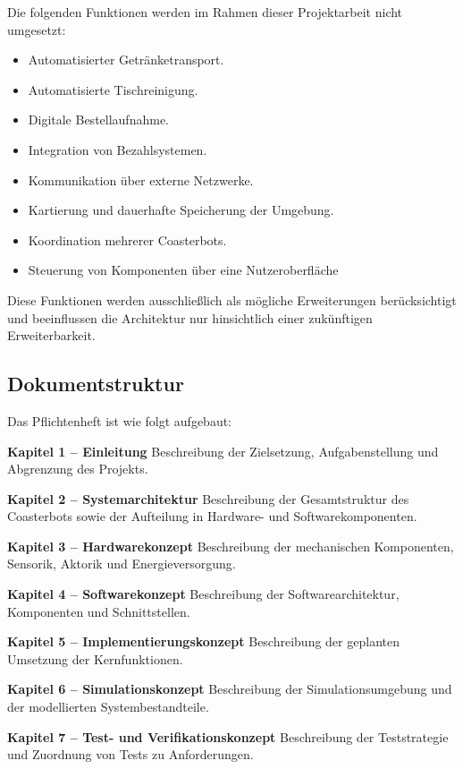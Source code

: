 Die folgenden Funktionen werden im Rahmen dieser Projektarbeit nicht
umgesetzt:

\begin{itemize}
\tightlist
\item
  Automatisierter Getränketransport.
\item
  Automatisierte Tischreinigung.
\item
  Digitale Bestellaufnahme.
\item
  Integration von Bezahlsystemen.
\item
  Kommunikation über externe Netzwerke.
\item
  Kartierung und dauerhafte Speicherung der Umgebung.
\item
  Koordination mehrerer Coasterbots.
\item
  Steuerung von Komponenten über eine Nutzeroberfläche
\end{itemize}

Diese Funktionen werden ausschließlich als mögliche Erweiterungen
berücksichtigt und beeinflussen die Architektur nur hinsichtlich einer
zukünftigen Erweiterbarkeit.

\subsection{Dokumentstruktur}\label{dokumentstruktur}

Das Pflichtenheft ist wie folgt aufgebaut:

\textbf{Kapitel 1 -- Einleitung} Beschreibung der Zielsetzung,
Aufgabenstellung und Abgrenzung des Projekts.

\textbf{Kapitel 2 -- Systemarchitektur} Beschreibung der Gesamtstruktur
des Coasterbots sowie der Aufteilung in Hardware- und
Softwarekomponenten.

\textbf{Kapitel 3 -- Hardwarekonzept} Beschreibung der mechanischen
Komponenten, Sensorik, Aktorik und Energieversorgung.

\textbf{Kapitel 4 -- Softwarekonzept} Beschreibung der
Softwarearchitektur, Komponenten und Schnittstellen.

\textbf{Kapitel 5 -- Implementierungskonzept} Beschreibung der geplanten
Umsetzung der Kernfunktionen.

\textbf{Kapitel 6 -- Simulationskonzept} Beschreibung der
Simulationsumgebung und der modellierten Systembestandteile.

\textbf{Kapitel 7 -- Test- und Verifikationskonzept} Beschreibung der
Teststrategie und Zuordnung von Tests zu Anforderungen.

